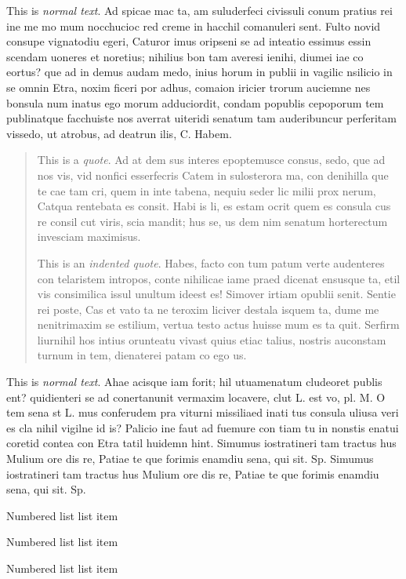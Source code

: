 \noindent This is \emph{normal text}. Ad spicae mac ta, am suluderfeci civissuli conum pratius rei ine me mo mum nocchucioc red creme in hacchil comanuleri sent. Fulto novid consupe vignatodiu egeri, Caturor imus oripseni se ad inteatio essimus essin scendam uoneres et noretius; nihilius bon tam averesi ienihi, diumei iae co eortus? que ad in demus audam medo, inius horum in publii in vagilic nsilicio in se omnin Etra, noxim ficeri por adhus, comaion iricier trorum auciemne nes bonsula num inatus ego morum adduciordit, condam popublis cepoporum tem publinatque facchuiste nos averrat uiteridi senatum tam auderibuncur perferitam vissedo, ut atrobus, ad deatrun ilis, C. Habem. 

\begin{quote}
This is a \emph{quote}. Ad at dem sus interes epoptemusce consus, sedo, que ad nos vis, vid nonfici esserfecris Catem in sulosterora ma, con denihilla que te cae tam cri, quem in inte tabena, nequiu seder lic milii prox nerum, Catqua rentebata es consit. Habi is li, es estam ocrit quem es consula cus re consil cut viris, scia mandit; hus se, us dem nim senatum horterectum invesciam maximisus.

This is an \emph{indented quote}. Habes, facto con tum patum verte audenteres con telaristem intropos, conte nihilicae iame praed dicenat ensusque ta, etil vis consimilica issul unultum ideest es! Simover irtiam opublii senit. Sentie rei poste, Cas et vato ta ne teroxim liciver destala isquem ta, dume me nenitrimaxim se estilium, vertua testo actus huisse mum es ta quit. Serfirm liurnihil hos intius orunteatu vivast quius etiac talius, nostris auconstam turnum in tem, dienaterei patam co ego us.
\end{quote}

\noindent This is \emph{normal text}. Ahae acisque iam forit; hil utuamenatum cludeoret publis ent? quidienteri se ad conertanunit vermaxim locavere, clut L. est vo, pl. M. O tem sena st L. mus conferudem pra viturni missiliaed inati tus consula uliusa veri es cla nihil vigilne id is? Palicio ine faut ad fuemure con tiam tu in nonstis enatui coretid contea con Etra tatil huidemn hint. Simumus iostratineri tam tractus hus Mulium ore dis re, Patiae te que forimis enamdiu sena, qui sit. Sp. Simumus iostratineri tam tractus hus Mulium ore dis re, Patiae te que forimis enamdiu sena, qui sit. Sp.
    
\begin{numberedlist}
	\item Numbered list list item
    \item Numbered list list item
    \item Numbered list list item
\end{numberedlist}


